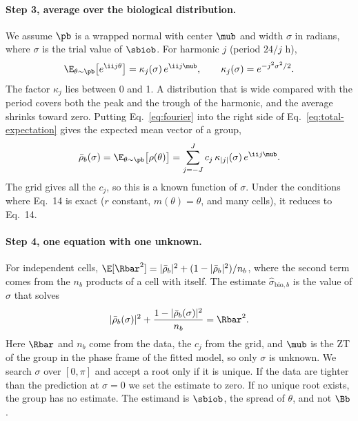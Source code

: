 \paragraph{Step 3, average over the biological distribution.}

We assume $\pb$ is a wrapped normal with center $\mub$ and width $\sigma$ in radians, where $\sigma$ is the trial value of $\sbiob$. For harmonic $j$ (period $24/j$ h),
\begin{equation}
\E_{\theta \sim \pb}\big[e^{\ii j\theta}\big] = \kappa_j(\sigma)\, e^{\ii j\mub},
\qquad
\kappa_j(\sigma) = e^{-j^2\sigma^2/2}.
\label{eq:kappa}
\end{equation}
The factor $\kappa_j$ lies between 0 and 1. A distribution that is wide compared with the period covers both the peak and the trough of the harmonic, and the average shrinks toward zero. Putting Eq.~\eqref{eq:fourier} into the right side of Eq.~\eqref{eq:total-expectation} gives the expected mean vector of a group,
\begin{equation}
\bar\rho_b(\sigma) = \E_{\theta \sim \pb}\big[\rho(\theta)\big] = \sum_{j=-J}^{J} c_j\, \kappa_{|j|}(\sigma)\, e^{\ii j\mub}.
\label{eq:rhobar}
\end{equation}
The grid gives all the $c_j$, so this is a known function of $\sigma$. Under the conditions where Eq.~14 is exact ($r$ constant, $m(\theta) = \theta$, and many cells), it reduces to Eq.~14.

\paragraph{Step 4, one equation with one unknown.}

For independent cells, $\E[\Rbar^2] = |\bar\rho_b|^2 + (1 - |\bar\rho_b|^2)/n_b$, where the second term comes from the $n_b$ products of a cell with itself. The estimate $\hat\sigma_{\text{bio},b}$ is the value of $\sigma$ that solves
\begin{equation}
|\bar\rho_b(\sigma)|^2 + \frac{1 - |\bar\rho_b(\sigma)|^2}{n_b} = \Rbar^2 .
\label{eq:vector-equation}
\end{equation}
Here $\Rbar$ and $n_b$ come from the data, the $c_j$ from the grid, and $\mub$ is the ZT of the group in the phase frame of the fitted model, so only $\sigma$ is unknown. We search $\sigma$ over $[0,\pi]$ and accept a root only if it is unique. If the data are tighter than the prediction at $\sigma = 0$ we set the estimate to zero. If no unique root exists, the group has no estimate. The estimand is $\sbiob$, the spread of $\theta$, and not $\Bb$.

